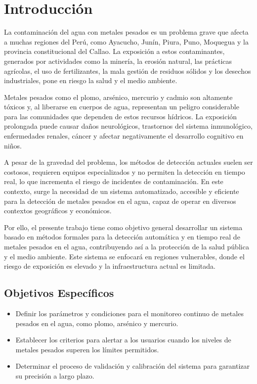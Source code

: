 \section{Introducción}  
La contaminación del agua con metales pesados es un problema grave que afecta a muchas regiones del Perú, como Ayacucho, Junín, Piura, Puno, Moquegua y la provincia constitucional del Callao. La exposición a estos contaminantes, generados por actividades como la minería, la erosión natural, las prácticas agrícolas, el uso de fertilizantes, la mala gestión de residuos sólidos y los desechos industriales, pone en riesgo la salud y el medio ambiente.  

Metales pesados como el plomo, arsénico, mercurio y cadmio son altamente tóxicos y, al liberarse en cuerpos de agua, representan un peligro considerable para las comunidades que dependen de estos recursos hídricos. La exposición prolongada puede causar daños neurológicos, trastornos del sistema inmunológico, enfermedades renales, cáncer y afectar negativamente el desarrollo cognitivo en niños.  

A pesar de la gravedad del problema, los métodos de detección actuales suelen ser costosos, requieren equipos especializados y no permiten la detección en tiempo real, lo que incrementa el riesgo de incidentes de contaminación. En este contexto, surge la necesidad de un sistema automatizado, accesible y eficiente para la detección de metales pesados en el agua, capaz de operar en diversos contextos geográficos y económicos.  

Por ello, el presente trabajo tiene como objetivo general desarrollar un sistema basado en métodos formales para la detección automática y en tiempo real de metales pesados en el agua, contribuyendo así a la protección de la salud pública y el medio ambiente. Este sistema se enfocará en regiones vulnerables, donde el riesgo de exposición es elevado y la infraestructura actual es limitada.

\subsection{Objetivos Específicos}  
\begin{itemize}  
    \item Definir los parámetros y condiciones para el monitoreo continuo de metales pesados en el agua, como plomo, arsénico y mercurio.  
    \item Establecer los criterios para alertar a los usuarios cuando los niveles de metales pesados superen los límites permitidos.  
    \item Determinar el proceso de validación y calibración del sistema para garantizar su precisión a largo plazo.  
\end{itemize}  
